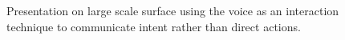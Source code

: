 \documentclass[review,journal]{vgtc}         %
\begin{document}








\begin{figure}[t]
	\centering
	\caption{Presentation on large scale surface using the voice as an interaction technique to communicate intent rather than direct actions.}
	\label{img:dome_presentation}
\end{figure}
\end{document}
